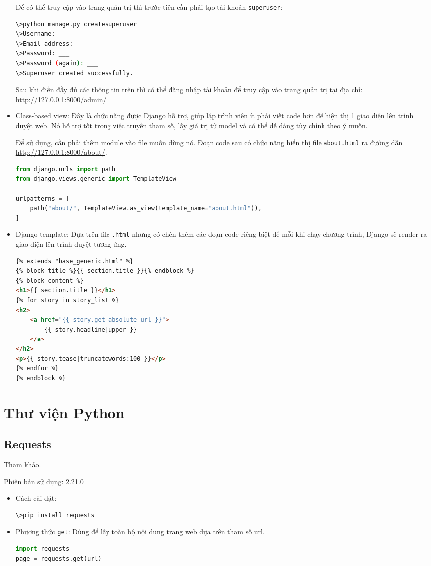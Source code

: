 \begin{itemize}
	\par
	Để có thể truy cập vào trang quản trị thì trước tiên cần phải tạo tài khoản \texttt{superuser}:
	\begin{lstlisting}[language=bash]
\>python manage.py createsuperuser
\>Username: ___
\>Email address: ___
\>Password: ___
\>Password (again): ___
\>Superuser created successfully.
	\end{lstlisting}
	Sau khi điền đầy đủ các thông tin trên thì có thể đăng nhập tài khoản để truy cập vào trang quản trị tại địa chỉ: \url{http://127.0.0.1:8000/admin/}
	\item Class-based view: Đây là chức năng được Django hỗ trợ, giúp lập trình viên ít phải viết code hơn để hiện thị 1 giao diện lên trình duyệt web. Nó hỗ trợ tốt trong việc truyền tham số, lấy giá trị từ model và có thể dễ dàng tùy chỉnh theo ý muốn.
	\par
	Để sử dụng, cần phải thêm module vào file muốn dùng nó. Đoạn code sau có chức năng hiển thị file \texttt{about.html} ra đường dẫn \url{http://127.0.0.1:8000/about/}.
	\begin{lstlisting}[language=Python]
from django.urls import path
from django.views.generic import TemplateView

urlpatterns = [
	path("about/", TemplateView.as_view(template_name="about.html")),
]
	\end{lstlisting}
	\item Django template: Dựa trên file \texttt{.html} nhưng có chèn thêm các đoạn code riêng biệt để mỗi khi chạy chương trình, Django sẽ render ra giao diện lên trình duyệt tương ứng.
	\begin{lstlisting}[language=HTML]
{% extends "base_generic.html" %}
{% block title %}{{ section.title }}{% endblock %}
{% block content %}
<h1>{{ section.title }}</h1>
{% for story in story_list %}
<h2>
 	<a href="{{ story.get_absolute_url }}">
		{{ story.headline|upper }}
	</a>
</h2>
<p>{{ story.tease|truncatewords:100 }}</p>
{% endfor %}
{% endblock %}
	\end{lstlisting}
\end{itemize}
\section{Thư viện Python}
\subsection{Requests}
Tham khảo\cite{requests}.
\par
Phiên bản sử dụng: 2.21.0
\begin{itemize}
	\item Cách cài đặt:
	\begin{lstlisting}[language=bash]
\>pip install requests
	\end{lstlisting}
	\item Phương thức \texttt{get}: Dùng để 	lấy toàn bộ nội dung trang web dựa trên tham số url.
	\begin{lstlisting}[language=Python]
import requests
page = requests.get(url)
	\end{lstlisting}
\end{itemize}
